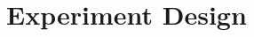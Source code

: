 \chapter{Experiment Design} \label{appendix:c}

\graphicspath{
	{appendixC/experiment_check_list/PDF/}
	{appendixC/participation_sheet/}}



